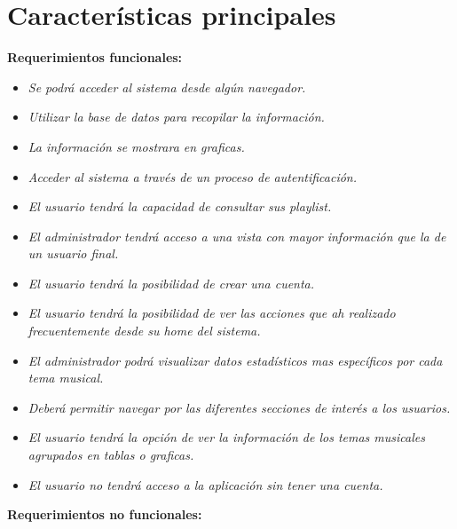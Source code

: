 \documentclass[12pt,a4paper]{book}
\begin{document}
\section{Características principales}
\vspace{0.5 cm}
\textbf {Requerimientos funcionales:}
\vspace{0.5 cm}
\begin{itemize}
\item \textit{Se podrá acceder al sistema desde algún navegador.}
\item \textit{Utilizar la base de datos para recopilar la información.}
\item \textit{La información se mostrara en graficas.}
\item \textit{Acceder al sistema a través de un proceso de autentificación.}
\item \textit{El usuario tendrá la capacidad de consultar sus playlist.}
\item \textit{El administrador tendrá acceso a una vista con mayor información que la de un usuario final.}
\item \textit{El usuario tendrá la posibilidad de crear una cuenta.}
\item \textit{El usuario tendrá la posibilidad de ver las acciones que ah realizado frecuentemente desde su home del sistema.}
\item \textit{El administrador podrá visualizar datos estadísticos mas específicos por cada tema musical.}
\item \textit{Deberá permitir navegar por las diferentes secciones de interés a los usuarios.}
\item \textit{El usuario tendrá la opción de ver la información de los temas musicales agrupados en tablas o graficas.}
\item \textit{El usuario no tendrá acceso a la aplicación sin tener una cuenta.}
\end{itemize}
\newpage
\textbf {Requerimientos no funcionales:}
\vspace{0.5 cm}
\end{document}
